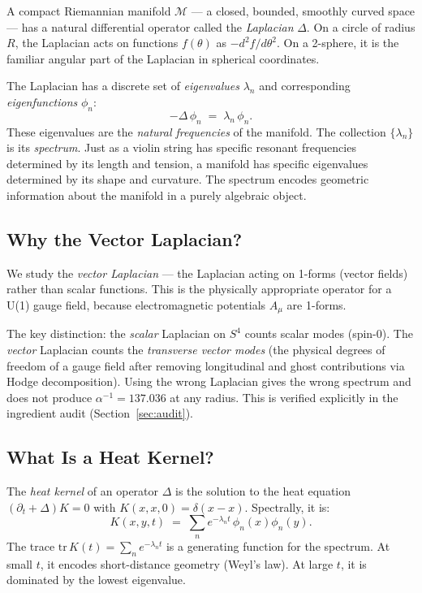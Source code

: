 \documentclass[12pt,a4paper]{article}
\begin{document}
A compact Riemannian manifold $\mathcal{M}$ --- a closed,
bounded, smoothly curved space --- has a natural
differential operator called the \emph{Laplacian} $\Delta$.
On a circle of radius $R$, the Laplacian acts on
functions $f(\theta)$ as $-d^2f/d\theta^2$.
On a 2-sphere, it is the familiar angular part of the
Laplacian in spherical coordinates.

The Laplacian has a discrete set of
\emph{eigenvalues} $\lambda_n$ and
corresponding \emph{eigenfunctions} $\phi_n$:
\begin{equation}
  -\Delta\,\phi_n \;=\; \lambda_n\,\phi_n.
\end{equation}
These eigenvalues are the \emph{natural frequencies}
of the manifold.
The collection $\{\lambda_n\}$ is its \emph{spectrum}.
Just as a violin string has specific resonant frequencies
determined by its length and tension, a manifold has
specific eigenvalues determined by its shape and curvature.
The spectrum encodes geometric information
about the manifold in a purely algebraic object.

\subsection{Why the Vector Laplacian?}

We study the \emph{vector Laplacian} --- the Laplacian
acting on 1-forms (vector fields) rather than scalar
functions. This is the physically appropriate operator
for a U(1) gauge field, because electromagnetic
potentials $A_\mu$ are 1-forms.

The key distinction: the \emph{scalar} Laplacian on $S^4$
counts scalar modes (spin-0).
The \emph{vector} Laplacian counts the
\emph{transverse vector modes} (the physical degrees of
freedom of a gauge field after removing longitudinal
and ghost contributions via Hodge decomposition).
Using the wrong Laplacian gives the wrong spectrum
and does not produce $\alpha^{-1} = 137.036$ at any radius.
This is verified explicitly in the ingredient audit
(Section~\ref{sec:audit}).

\subsection{What Is a Heat Kernel?}

The \emph{heat kernel} of an operator $\Delta$ is the
solution to the heat equation
$(\partial_t + \Delta)K = 0$ with $K(x,x,0) = \delta(x-x)$.
Spectrally, it is:
\begin{equation}
  K(x,y,t) \;=\; \sum_n e^{-\lambda_n t}\,\phi_n(x)\phi_n(y).
\end{equation}
The trace $\mathrm{tr}\,K(t) = \sum_n e^{-\lambda_n t}$
is a generating function for the spectrum.
At small $t$, it encodes short-distance geometry
(Weyl's law).
At large $t$, it is dominated by the lowest eigenvalue.
\end{document}
